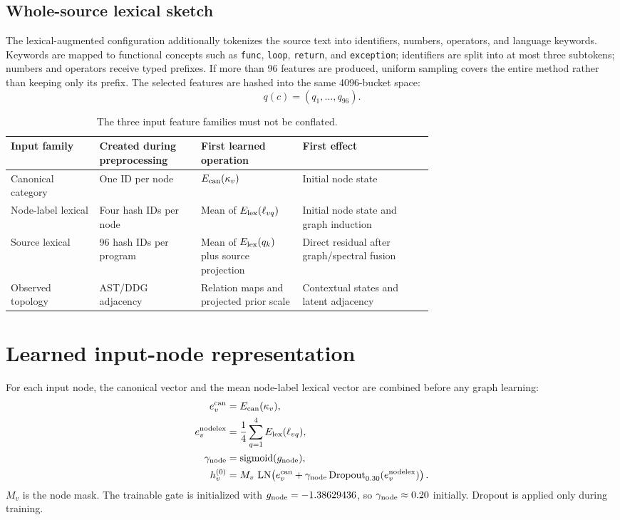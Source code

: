 \documentclass[11pt,a4paper]{article}
\newcommand{\sigmoid}{\operatorname{sigmoid}}
\newcommand{\LN}{\operatorname{LN}}
\begin{document}
\subsection{Whole-source lexical sketch}

The lexical-augmented configuration additionally tokenizes the source text into
identifiers, numbers, operators, and language keywords. Keywords are mapped to
functional concepts such as \texttt{func}, \texttt{loop}, \texttt{return}, and
\texttt{exception}; identifiers are split into at most three subtokens; numbers
and operators receive typed prefixes. If more than 96 features are produced,
uniform sampling covers the entire method rather than keeping only its prefix.
The selected features are hashed into the same 4096-bucket space:
\begin{equation}
q(c)=(q_1,\ldots,q_{96}).
\end{equation}

\begin{table}[H]
\centering
\small
\begin{tabularx}{\linewidth}{@{}p{0.21\linewidth}p{0.24\linewidth}p{0.24\linewidth}X@{}}
\toprule
Input family & Created during preprocessing & First learned operation & First effect \\
\midrule
Canonical category & One ID per node & $E_{\rm can}(\kappa_v)$ & Initial node state \\
Node-label lexical & Four hash IDs per node & Mean of $E_{\rm lex}(\ell_{vq})$ & Initial node state and graph induction \\
Source lexical & 96 hash IDs per program & Mean of $E_{\rm lex}(q_k)$ plus source projection & Direct residual after graph/spectral fusion \\
Observed topology & AST/DDG adjacency & Relation maps and projected prior scale & Contextual states and latent adjacency \\
\bottomrule
\end{tabularx}
\caption{The three input feature families must not be conflated.}
\end{table}

\section{Learned input-node representation}

For each input node, the canonical vector and the mean node-label lexical vector
are combined before any graph learning:
\begin{align}
e_v^{\rm can}&=E_{\rm can}(\kappa_v),\\
e_v^{\rm nodelex}&=\frac{1}{4}\sum_{q=1}^{4}E_{\rm lex}(\ell_{vq}),\\
\gamma_{\rm node}&=\sigmoid(g_{\rm node}),\\
h_v^{(0)}
&=M_v\,
\LN\!\left(e_v^{\rm can}
+\gamma_{\rm node}\operatorname{Dropout}_{0.30}
(e_v^{\rm nodelex})\right).
\end{align}
$M_v$ is the node mask. The trainable gate is initialized with
$g_{\rm node}=-1.38629436$, so $\gamma_{\rm node}\approx0.20$ initially.
Dropout is applied only during training.
\end{document}
